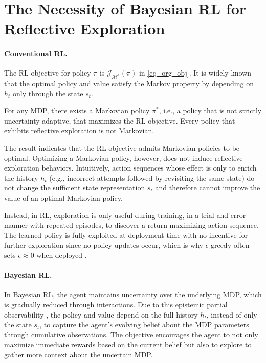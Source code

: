 \section{The Necessity of Bayesian RL for Reflective Exploration}\label{eq_nece}
\paragraph{Conventional RL.} The RL objective for policy $\pi$ is $\mathcal{J}_{\mathcal{M}^*}(\pi)$ in \eqref{eq_org_obj}. It is widely known that the optimal policy and value satisfy the Markov property by depending on $h_t$ only through the state $s_t$.

\begin{theorem}\label{remark_1}
For any MDP, there exists a Markovian policy $\pi^*$, i.e., a policy that is not strictly uncertainty-adaptive, that maximizes the RL objective. Every policy that exhibits reflective exploration is not Markovian.
\end{theorem}

The result indicates that the RL objective admits Markovian policies to be optimal. Optimizing a Markovian policy, however, does not induce reflective exploration behaviors. Intuitively, action sequences whose effect is only to enrich the history $h_t$ (e.g., incorrect attempts followed by revisiting the same state) do not change the sufficient state representation $s_t$ and therefore cannot improve the value of an optimal Markovian policy.

Instead, in RL, exploration is only useful during training, in a trial-and-error manner with repeated episodes, to discover a return-maximizing action sequence. The learned policy is fully exploited at deployment time with no incentive for further exploration since no policy updates occur, which is why $\epsilon$-greedy often sets $\epsilon\approx0$ when deployed \citep{mnih2015human,hessel2018rainbow}.

\vspace{-0.15cm}
\paragraph{Bayesian RL.} In Bayesian RL, the agent maintains uncertainty over the underlying MDP, which is gradually reduced through interactions. Due to this epistemic partial observability \citep{duff2001monte,ghosh2021generalization}, the policy and value depend on the full history $h_t$, instead of only the state $s_t$, to capture the agent’s evolving belief about the MDP parameters through cumulative observations. The objective encourages the agent to not only maximize immediate rewards based on the current belief but also to explore to gather more context about the uncertain MDP.

